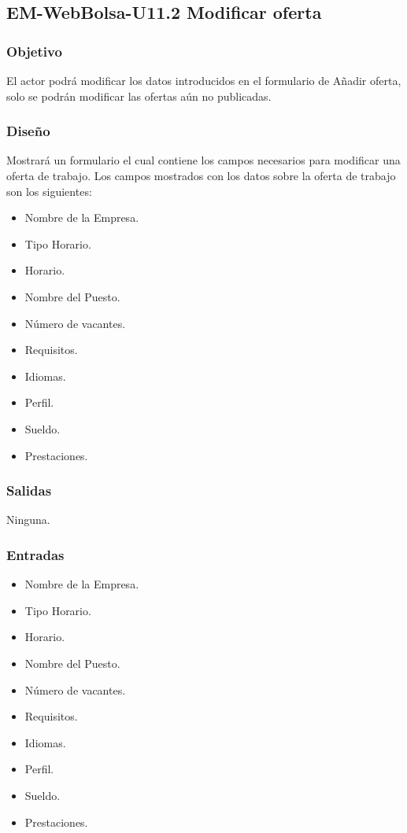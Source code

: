 \subsection{EM-WebBolsa-U11.2 Modificar oferta}

\subsubsection{Objetivo}
	\noindent
	El actor podrá modificar los datos introducidos en el formulario de Añadir oferta, solo se podrán modificar las ofertas aún no publicadas. 

\subsubsection{Diseño}
	\noindent
	Mostrará un formulario el cual contiene los campos necesarios para modificar una oferta de trabajo. 
	Los campos mostrados con los datos sobre la oferta de trabajo son los siguientes: 
	\begin{itemize}
		\item Nombre de la Empresa.
		\item Tipo Horario.
		\item Horario.
		\item Nombre del Puesto.
		\item Número de vacantes.
		\item Requisitos.
		\item Idiomas.
		\item Perfil.
		\item Sueldo.
		\item Prestaciones. 
	\end{itemize}


\subsubsection{Salidas}
	\noindent
	Ninguna.
	
\subsubsection{Entradas}
	\begin{itemize}
		\item Nombre de la Empresa.
		\item Tipo Horario.
		\item Horario.
		\item Nombre del Puesto.
		\item Número de vacantes.
		\item Requisitos.
		\item Idiomas.
		\item Perfil.
		\item Sueldo.
		\item Prestaciones. 
	\end{itemize}

